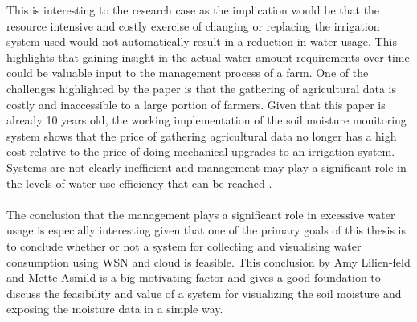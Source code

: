 \documentclass[]{uiophd}
\begin{document}
This is interesting to the research case as the implication would be that the resource intensive and costly exercise of changing or replacing the irrigation system used would not automatically result in a reduction in water usage. This highlights that gaining insight in the actual water amount requirements over time could be valuable input to the management process of a farm. One of  the challenges highlighted by the paper \cite{LILIENFELD200773} is that the gathering of agricultural data is costly and inaccessible to a large portion of farmers. Given that this paper is already 10 years old, the working implementation of the soil moisture monitoring system shows that the price of gathering agricultural data no longer has a high cost relative to the price of doing mechanical upgrades to an irrigation system. Systems are not clearly inefficient and management may play a significant role in the levels of water use efficiency that can be reached \cite{LILIENFELD200773}.
\\\\
The conclusion that the management plays a significant role in excessive water usage is especially interesting given that one of the primary goals of this thesis is to conclude whether or not a system for collecting and visualising water consumption using WSN and cloud is feasible. This conclusion by Amy Lilien-feld and Mette Asmild is a big motivating factor and gives a good foundation to discuss the feasibility and value of a system for visualizing the soil moisture and exposing the moisture data in a simple way.
\end{document}
